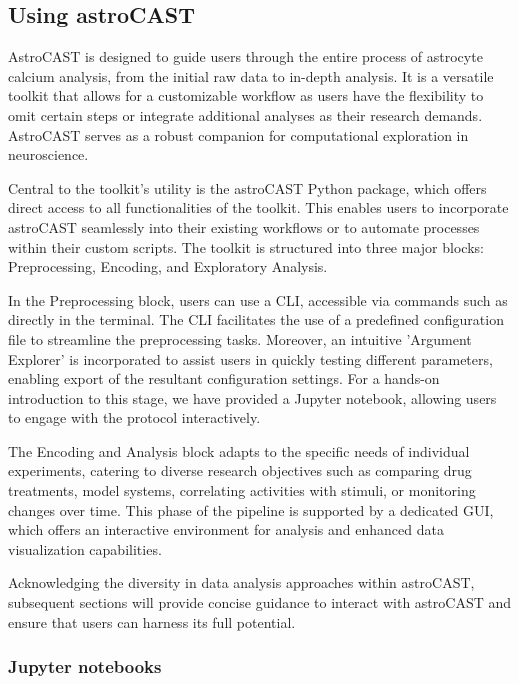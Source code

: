 \subsection{Using astroCAST}

AstroCAST is designed to guide users through the entire process of astrocyte calcium analysis, from the initial raw data to in-depth analysis. It is a versatile toolkit that allows for a customizable workflow as users have the flexibility to omit certain steps or integrate additional analyses as their research demands. AstroCAST serves as a robust companion for computational exploration in neuroscience.

Central to the toolkit's utility is the astroCAST Python package, which offers direct access to all functionalities of the toolkit. This enables users to incorporate astroCAST seamlessly into their existing workflows or to automate processes within their custom scripts. The toolkit is structured into three major blocks: Preprocessing, Encoding, and Exploratory Analysis.

In the Preprocessing block, users can use a \ac{CLI}, accessible via commands such as  directly in the terminal. The \ac{CLI} facilitates the use of a predefined configuration file to streamline the preprocessing tasks. Moreover, an intuitive 'Argument Explorer' is incorporated to assist users in quickly testing different parameters, enabling export of the resultant configuration settings. For a hands-on introduction to this stage, we have provided a Jupyter notebook, allowing users to engage with the protocol interactively.

The Encoding and Analysis block adapts to the specific needs of individual experiments, catering to diverse research objectives such as comparing drug treatments, model systems, correlating activities with stimuli, or monitoring changes over time. This phase of the pipeline is supported by a dedicated \ac{GUI}, which offers an interactive environment for analysis and enhanced data visualization capabilities.

Acknowledging the diversity in data analysis approaches within \ac{astroCAST}, subsequent sections will provide concise guidance to interact with astroCAST and ensure that users can harness its full potential.

\subsubsection{Jupyter notebooks}

